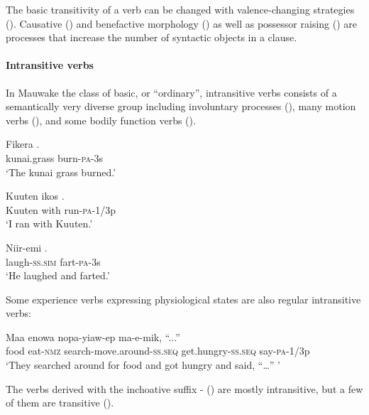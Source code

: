 The basic transitivity of a verb can be changed with valence-changing strategies (). Causative () and benefactive morphology () as well as possessor raising () are processes that increase the number of syntactic objects in a clause.

\paragraph[Intransitive verbs]{Intransitive verbs}
{}
In Mauwake the class of basic, or ``ordinary'', intransitive verbs consists of a semantically very diverse group including involuntary processes (), many motion verbs (), and some bodily function verbs ().

\ea%
\label{ex:x266}
\gll Fikera . \\
kunai.grass burn-\textsc{pa}-3s \\
\glt`The kunai grass burned.'
\z

\ea%
\label{ex:x267}
\gll Kuuten ikos . \\
Kuuten with run-\textsc{pa}-1/3p \\
\glt`I ran with Kuuten.'
\z

\ea%
\label{ex:x269}
\gll Niir-emi . \\
laugh-\textsc{ss}.\textsc{sim} fart-\textsc{pa}-3s \\
\glt`He laughed and farted.'
\z

Some experience verbs expressing physiological states are also regular intransitive verbs:

\ea%
\label{ex:x1485}
\gll Maa enowa nopa-yiaw-ep  ma-e-mik, ``...''\\
food eat-\textsc{nmz} search-move.around-\textsc{ss}.\textsc{seq} get.hungry-\textsc{ss}.\textsc{seq} say-\textsc{pa}-1/3p\\
\glt`They searched around for food and got hungry and said, ``{\dots}'' '
\z

The verbs derived with the inchoative suffix \nobreakdash- () are mostly intransitive, but a few of them are transitive (). 

